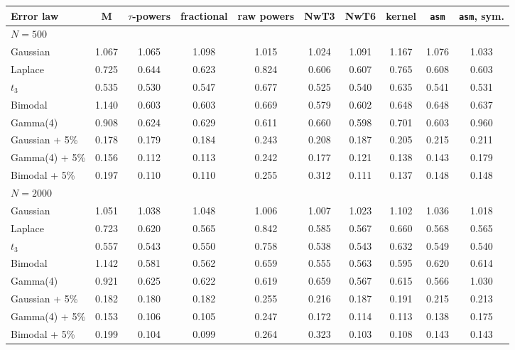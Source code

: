\begin{tabular}{lccccccccc}
\toprule
Error law & M & $\tau$-powers & fractional & raw powers & NwT3 & NwT6 & kernel & \texttt{asm} & \texttt{asm}, sym. \\
\midrule
\multicolumn{10}{l}{\emph{$N=500$}} \\
Gaussian & 1.067 & 1.065 & 1.098 & 1.015 & 1.024 & 1.091 & 1.167 & 1.076 & 1.033 \\
Laplace & 0.725 & 0.644 & 0.623 & 0.824 & 0.606 & 0.607 & 0.765 & 0.608 & 0.603 \\
$t_3$ & 0.535 & 0.530 & 0.547 & 0.677 & 0.525 & 0.540 & 0.635 & 0.541 & 0.531 \\
Bimodal & 1.140 & 0.603 & 0.603 & 0.669 & 0.579 & 0.602 & 0.648 & 0.648 & 0.637 \\
Gamma(4) & 0.908 & 0.624 & 0.629 & 0.611 & 0.660 & 0.598 & 0.701 & 0.603 & 0.960 \\
Gaussian + 5\% & 0.178 & 0.179 & 0.184 & 0.243 & 0.208 & 0.187 & 0.205 & 0.215 & 0.211 \\
Gamma(4) + 5\% & 0.156 & 0.112 & 0.113 & 0.242 & 0.177 & 0.121 & 0.138 & 0.143 & 0.179 \\
Bimodal + 5\% & 0.197 & 0.110 & 0.110 & 0.255 & 0.312 & 0.111 & 0.137 & 0.148 & 0.148 \\
\multicolumn{10}{l}{\emph{$N=2000$}} \\
Gaussian & 1.051 & 1.038 & 1.048 & 1.006 & 1.007 & 1.023 & 1.102 & 1.036 & 1.018 \\
Laplace & 0.723 & 0.620 & 0.565 & 0.842 & 0.585 & 0.567 & 0.660 & 0.568 & 0.565 \\
$t_3$ & 0.557 & 0.543 & 0.550 & 0.758 & 0.538 & 0.543 & 0.632 & 0.549 & 0.540 \\
Bimodal & 1.142 & 0.581 & 0.562 & 0.659 & 0.555 & 0.563 & 0.595 & 0.620 & 0.614 \\
Gamma(4) & 0.921 & 0.625 & 0.622 & 0.619 & 0.659 & 0.567 & 0.615 & 0.566 & 1.030 \\
Gaussian + 5\% & 0.182 & 0.180 & 0.182 & 0.255 & 0.216 & 0.187 & 0.191 & 0.215 & 0.213 \\
Gamma(4) + 5\% & 0.153 & 0.106 & 0.105 & 0.247 & 0.172 & 0.114 & 0.113 & 0.138 & 0.175 \\
Bimodal + 5\% & 0.199 & 0.104 & 0.099 & 0.264 & 0.323 & 0.103 & 0.108 & 0.143 & 0.143 \\
\bottomrule
\end{tabular}
